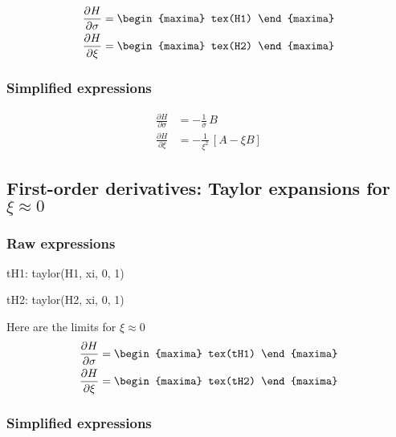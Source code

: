 {\color{MonVertF}
\begin{align*}
\frac{\partial H}{\partial \sigma}  &=
\begin{maxima}
 tex(H1)
\end{maxima}
\\
\frac{\partial H}{\partial \xi} &=
\begin{maxima}
 tex(H2)
\end{maxima}
\end{align*}
}

\subsubsection*{Simplified expressions}

{\color{red}
\begin{align*}
  \frac{\partial H}{\partial \sigma}
  &= - \frac{1}{\sigma}\, B  \\
  \frac{\partial H}{\partial \xi}
  &= -\frac{1}{\xi^2} \, \left[A - \xi B \right]
\end{align*}
}


\subsection{First-order derivatives: Taylor expansions for $\xi \approx 0$}
\subsubsection*{Raw expressions}
\begin{maxima}
  tH1: taylor(H1, xi, 0, 1)
\end{maxima}
\begin{maxima}
  tH2: taylor(H2, xi, 0, 1)
\end{maxima}

Here are the limits for $\xi \approx  0$
{\color{MonVertF}
\begin{align*}
  \frac{\partial H}{\partial \sigma} &=
\begin{maxima}
  tex(tH1)
\end{maxima}\\
  \frac{\partial H}{\partial \xi} &=
\begin{maxima}
  tex(tH2)
\end{maxima}
\end{align*}
}

\subsubsection*{Simplified expressions}

